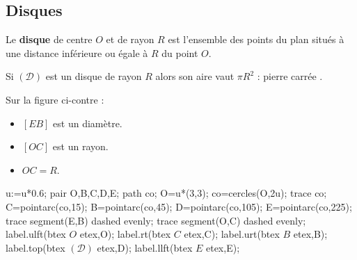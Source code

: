 \subsection{Disques}
\begin{definition}
    Le \textbf{disque} de centre $O$ et de rayon $R$ est l'ensemble des points du plan situés à une distance inférieure ou égale à $R$ du point $O$.    
\end{definition}
\begin{propriete}[\admise]
    Si $(\mathscr D)$ est un disque de rayon $R$ alors son aire vaut $\pi R^2$ : \og{} pierre carrée \fg{}.
\end{propriete}
\begin{exemple*1}

    \begin{minipage}{0.5\linewidth}
        Sur la figure ci-contre :
        \begin{itemize}
            \item $[EB]$ est un diamètre.
            \item $[OC]$ est un rayon.
            \item $OC=R$.
        \end{itemize}
    \end{minipage}
    \begin{minipage}{0.5\linewidth}
        \begin{center}
            \begin{Geometrie}
                u:=u*0.6; 
                pair O,B,C,D,E;
                path co;
                O=u*(3,3);
                co=cercles(O,2u);
                trace co;
                C=pointarc(co,15);
                B=pointarc(co,45);
                D=pointarc(co,105);
                E=pointarc(co,225);
                trace segment(E,B) dashed evenly;
                trace segment(O,C) dashed evenly;
                label.ulft(btex $O$ etex,O);
                label.rt(btex $C$ etex,C);
                label.urt(btex $B$ etex,B);
                label.top(btex $(\mathcal{D})$ etex,D);
                label.llft(btex $E$ etex,E);
            \end{Geometrie}
        \end{center}
    \end{minipage}
    \vspace*{-5mm}
\end{exemple*1}
